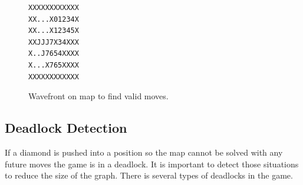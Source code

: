 \begin{figure}[h]
 \centering
 \begin{minipage}{0.1\textwidth}
\begin{verbatim}
XXXXXXXXXXXX
XX...X01234X
XX...X12345X
XXJJJ7X34XXX
X..J7654XXXX
X...X765XXXX
XXXXXXXXXXXX
\end{verbatim}
 \end{minipage}
 \caption{Wavefront on map to find valid moves.}
 \label{fig:wavefront}
\end{figure}

\subsection{Deadlock Detection}
If a diamond is pushed into a position so the map cannot be solved with any future moves the game is in a deadlock.
It is important to detect those situations to reduce the size of the graph.
There is several types of deadlocks in the game.

